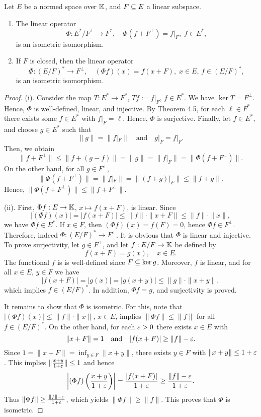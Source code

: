 \setcounter{theo}{9}  %
\begin{theo}\label{4:t:isoiso}
Let $E$ be a normed space over $\mathbb{K}$, and $F\subseteq E$ a linear subspace.
\begin{enumerate}
\item[(i)] The linear operator
$$
\Phi : E^*/F^\perp\to F^*,\quad \Phi(f + F^\perp) = f|_F,\;f\in E^*,
$$
is an isometric isomorphism.
\item[(ii)] If $F$ is closed, then the linear operator
$$
\Phi : (E/F)^*\to F^\perp,\quad (\Phi f)(x) = f(x+F),\;x\in E,\,f\in (E/F)^*,
$$
is an isometric isomorphism.
\end{enumerate}
\end{theo}
\begin{proof}
(i). Consider the map $T : E^*\to F^*$, $Tf := f|_F$, $f\in E^*$. We have $\ker T = F^\perp$. Hence, $\Phi$ is well-defined, linear, and injective. By Theorem 4.5, for each $\ell\in F^*$ there exists some $f\in E^*$ with $f|_F = \ell$. Hence, $\Phi$ is surjective. Finally, let $f\in E^*$, and choose $g\in E^*$ such that
$$
\|g\| = \|f|_F\|\quad\text{and}\quad g|_F = f|_F.
$$
Then, we obtain
$$
\|f + F^\perp\| \le \|f + (g-f)\| = \|g\| = \|f|_F\| = \|\Phi(f + F^\perp)\|.
$$
On the other hand, for all $g\in F^\perp$,
$$
\|\Phi(f + F^\perp)\| = \|f|_F\| = \|(f+g)|_F\|\le \|f + g\|.
$$
Hence, $\|\Phi(f + F^\perp)\|\le \|f + F^\perp\|$.

(ii). First, $\Phi f : E\to\mathbb{K}$, $x\mapsto f(x + F)$, is linear. Since
$$
|(\Phi f)(x)| = |f(x+F)|\le \|f\|\cdot\|x+F\|\le\|f\|\cdot\|x\|,
$$
we have $\Phi f\in E^*$. If $x\in F$, then $(\Phi f)(x) = f(F) = 0$, hence $\Phi f\in F^\perp$. Therefore, indeed $\Phi : (E/F)^*\to F^\perp$. It is obvious that $\Phi$ is linear and injective. To prove surjectivity, let $g\in F^\perp$, and let $f : E/F\to\mathbb{K}$ be defined by
$$
f(x+F) = g(x),\quad x\in E.
$$
The functional $f$ is is well-defined since $F\subseteq\operatorname{ker} g$. Moreover, $f$ is linear, and for all $x\in E$, $y\in F$ we have
$$
|f(x+F)| = |g(x)| = |g(x+y)|\le\|g\|\cdot\|x+y\|,
$$
which implies $f\in (E/F)^*$. In addition, $\Phi f = g$, and surjectivity is proved.

It remains to show that $\Phi$ is isometric. For this, note that $|(\Phi f)(x)|\le \|f\|\cdot\|x\|$, $x\in E$, implies $\|\Phi f\|\le\|f\|$ for all $f\in (E/F)^*$. On the other hand, for each $\varepsilon > 0$ there exists $x\in E$ with
$$
\|x + F\| = 1\quad\text{and}\quad |f(x + F)|\ge\|f\| - \varepsilon.
$$
Since $1 = \|x + F\| = \inf_{y\in F}\|x + y\|$, there exists $y\in F$ with $\|x + y\|\le 1+\varepsilon$. This implies $\|\frac{x+y}{1+\varepsilon}\|\le 1$ and hence
$$
\left|(\Phi f)\left(\frac{x+y}{1+\varepsilon}\right)\right| = \frac{|f(x+F)|}{1+\varepsilon}\ge\frac{\|f\| - \varepsilon}{1+\varepsilon}.
$$
Thus $\|\Phi f\|\ge \frac{\|f\| - \varepsilon}{1+\varepsilon}$, which yields $\|\Phi f\|\ge\|f\|$. This proves that $\Phi$ is isometric.
\end{proof}

